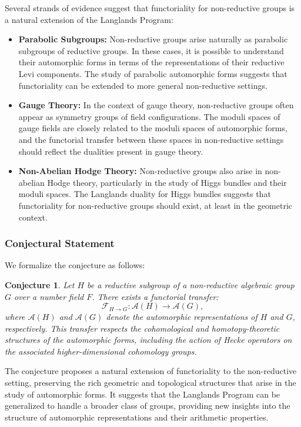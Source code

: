 \documentclass{article}
\newtheorem{conjecture}[theorem]{Conjecture}  %
\theoremstyle{remark}
\begin{document}
Several strands of evidence suggest that functoriality for non-reductive groups is a natural extension of the Langlands Program:
\begin{itemize}
    \item \textbf{Parabolic Subgroups:} Non-reductive groups arise naturally as parabolic subgroups of reductive groups. In these cases, it is possible to understand their automorphic forms in terms of the representations of their reductive Levi components. The study of parabolic automorphic forms suggests that functoriality can be extended to more general non-reductive settings.
    \item \textbf{Gauge Theory:} In the context of gauge theory, non-reductive groups often appear as symmetry groups of field configurations. The moduli spaces of gauge fields are closely related to the moduli spaces of automorphic forms, and the functorial transfer between these spaces in non-reductive settings should reflect the dualities present in gauge theory.
    \item \textbf{Non-Abelian Hodge Theory:} Non-reductive groups also arise in non-abelian Hodge theory, particularly in the study of Higgs bundles and their moduli spaces. The Langlands duality for Higgs bundles suggests that functoriality for non-reductive groups should exist, at least in the geometric context.
\end{itemize}

\subsubsection{Conjectural Statement}

We formalize the conjecture as follows:

\begin{conjecture}
Let $H$ be a reductive subgroup of a non-reductive algebraic group $G$ over a number field $F$. There exists a functorial transfer:
\[
\mathcal{F}_{H \to G}: \mathcal{A}(H) \to \mathcal{A}(G),
\]
where $\mathcal{A}(H)$ and $\mathcal{A}(G)$ denote the automorphic representations of $H$ and $G$, respectively. This transfer respects the cohomological and homotopy-theoretic structures of the automorphic forms, including the action of Hecke operators on the associated higher-dimensional cohomology groups.
\end{conjecture}

The conjecture proposes a natural extension of functoriality to the non-reductive setting, preserving the rich geometric and topological structures that arise in the study of automorphic forms. It suggests that the Langlands Program can be generalized to handle a broader class of groups, providing new insights into the structure of automorphic representations and their arithmetic properties.
\end{document}

